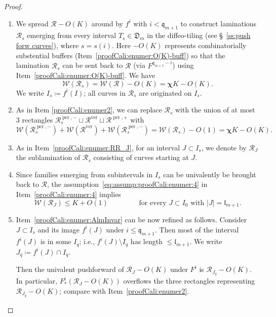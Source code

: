 \documentclass{amsart}
\newcommand{\1}{{\mathbb 1 }}
\newcommand{\Width}{{\mathcal W}}
\newcommand\RR{\mathcal{R}}
\newcommand{\qq}{\mathfrak{q}}
\newcommand{\length}{{\mathfrak l}}
\newcommand\ver{{\operatorname{ver}}}
\newcommand\per{{\operatorname{per}}}
\newcommand{\Dbb}{{\mathfrak{D}}}
\theoremstyle{remark}
\numberwithin{equation}{section}
\theoremstyle{definition}
\newcommand{\bchi}{{\boldsymbol{ \chi}}}
\begin{document}
\begin{proof}
     \begin{enumerate}[label=\text{(\arabic*)},font=\normalfont,leftmargin=*,start=8]
    \item We spread $\RR-O(K)$ around by $f^i$ with $i<\qq_{m+1}$ to construct laminations $\RR_s$ emerging from every interval $T_{s}\in \Dbb_m$ in the diffeo-tiling (see \S~\ref{ss:push forw curves}), where $s=s(i)$. Here $-O(K)$ represents combinatorially substential buffers (Item~\ref{proofCali:enumer:O(K)-buff}) so that the lamination $\RR_s$ can be sent back to $\RR$ (via $F^{\qq_{m+1}-i}$) using Item~\ref{proofCali:enumer:O(K)-buff}. We have 
    \begin{equation}
        \label{eq:RR_s_vs_RR} \Width(\RR_s) = \Width(\RR)-O(K)=\bchi K-O(K).
    \end{equation}
We write $I_s\coloneqq f^i(I)$; all curves in $\RR_s$ are originated on $I_s$.
    
       \item\label{proofCali:enumer:rect:RR_s} As in Item \ref{proofCali:enumer2}, we can replace $\RR_s$ with the union of at most $3$ rectangles $\RR_s^{\per,-}\sqcup\RR^\ver\sqcup \RR^{\per,+}$ with 
    \[\Width(\RR_s^{\per,-})+\Width(\RR^\ver)+\Width(\RR_s^{\per,-})=\Width(\RR_s)-O(1)= \bchi K -O(K).\]

  \item  As in Item~\ref{proofCali:enumer:RR_J}, for an interval $J\subset I_s$, we denote by $\RR_{J}$ the sublamination of $\RR_s$ consisting of curves starting at $J$. 

 \item Since families emerging from subintervals in $I_s$ can be univalently be brought back to $\RR$, the assumption~\eqref{eq:assump:proofCali:enumer:4} in Item~\ref{proofCali:enumer:4} implies
     \begin{equation}
         \label{eq:assump:proofCali:enumer:4:2} \Width(\RR_J)\le K+O(1)\qquad\qquad \text{ for every $J\subset I_0$ with $|J|=\length_{m+1}$}.
     \end{equation}


\item \label{proofCali:enumer:AI:refine} Item~\ref{proofCali:enumer:AlmInvar} can be now refined as follows. Consider $J\subset I_s$ and its image $f^{i}(J)$ under $i\le \qq_{m+1}$. Then most of the interval $f^{i}(J)$ is in some $I_q$; i.e., $f^{i}(J)\setminus I_q$ has length $\le \length_{m+1}$. We write $J_q\coloneqq f^{i}(J)\cap I_q$.

\noindent Then the univalent pushforward of $\RR_J-O(K)$ under $F^{i}$ is $\RR_{J_q}-O(K)$. In particular, $F^{i}_*(\RR_J-O(K))$ overflows the three rectangles representing $\RR_{J_q}-O(K)$; compare with Item~\ref{proofCali:enumer2}.


\end{enumerate}
\end{proof}
\end{document}
